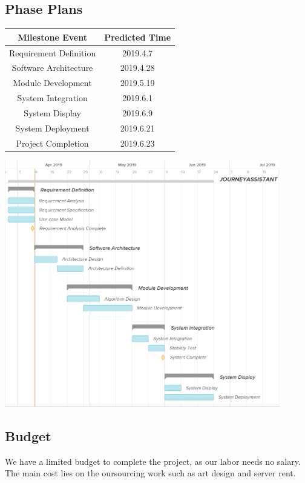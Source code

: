 \documentclass[10pt]{article}
\begin{document}
\subsection{Phase Plans}
\begin{center}
	\begin{tabular}{|c|c|} 
		\hline 
		\textbf{Milestone Event}&\textbf{Predicted Time}\\
		\hline  
		Requirement Definition&2019.4.7\\
		\hline
		Software Architecture&2019.4.28\\
		\hline
		Module Development&2019.5.19\\
		\hline
		System Integration&2019.6.1\\
		\hline
		System Display&2019.6.9\\
		\hline
		System Deployment&2019.6.21\\
		\hline
		Project Completion&2019.6.23\\
		\hline
	\end{tabular}    

	\includegraphics[width=12cm]{2.png}
\end{center}

\subsection{Budget}
We have a limited budget to complete the project, as our labor needs no salary. The main cost lies on the oursourcing work such as art design and server rent.
\end{document}
